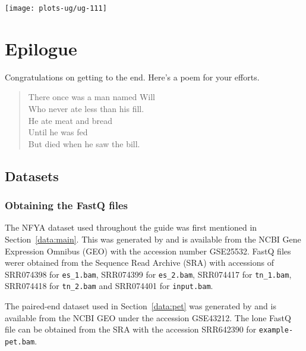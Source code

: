 \documentclass[12pt]{report}
\newcommand{\code}[1]{{\small\texttt{#1}}}
\newenvironment{combox}
{ \begin{shaded}\begin{center}\begin{minipage}[t]{0.95\textwidth} }
{ \end{minipage}\end{center}\end{shaded} }
\begin{document}
\begin{center}
\texttt{[image: plots-ug/ug-111]}
\end{center}



\chapter{Epilogue}

\begin{combox}
Congratulations on getting to the end. Here's a poem for your efforts.
\begin{quote}
There once was a man named Will \\
Who never ate less than his fill. \\
He ate meat and bread \\
Until he was fed \\
But died when he saw the bill. 
\end{quote}
\end{combox}

\section{Datasets}
\label{sec:dataset}

\subsection{Obtaining the FastQ files}
The NFYA dataset used throughout the guide was first mentioned in Section~\ref{data:main}. 
This was generated by \cite{tiwari2012} and is available from the NCBI Gene Expression Omnibus (GEO) with the accession number GSE25532. 
FastQ files werer obtained from the Sequence Read Archive (SRA) with accessions of SRR074398 for \code{es\_1.bam}, SRR074399 for \code{es\_2.bam}, SRR074417 for \code{tn\_1.bam}, SRR074418 for \code{tn\_2.bam} and SRR074401 for \code{input.bam}.

The paired-end dataset used in Section~\ref{data:pet} was generated by \cite{pal2013} and is available from the NCBI GEO under the accession GSE43212.
The lone FastQ file can be obtained from the SRA with the accession SRR642390 for \code{example-pet.bam}.
\end{document}
